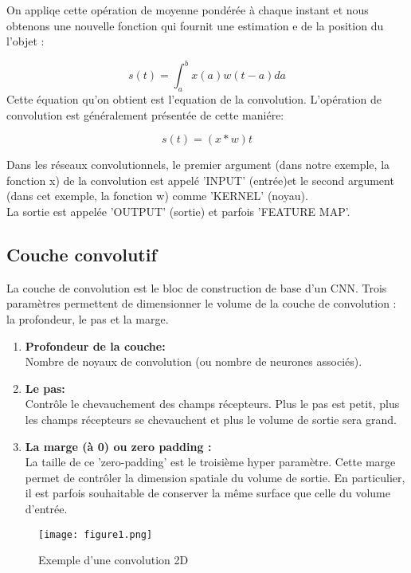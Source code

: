 \documentclass[a4paper,11pt]{report}
\begin{document}
On appliqe cette opération de moyenne pondérée à chaque instant et nous obtenons une
nouvelle fonction qui fournit une estimation e de la position du l'objet :

\begin{equation}
    s(t) =  \int_a^b  x(a)w(t-a)da
\end{equation}
Cette équation qu'on obtient est l'equation de la convolution. L’opération de convolution est généralement présentée  de cette maniére:       

\begin{equation}
    s(t) =   (x * w)t
\end{equation}

Dans les réseaux convolutionnels, le premier argument (dans notre exemple, la fonction x) de
la convolution est appelé 'INPUT' (entrée)et le second argument (dans cet exemple, la fonction
w) comme 'KERNEL' (noyau).\\
La sortie est appelée 'OUTPUT' (sortie) et parfois 'FEATURE MAP'.

\subsection {Couche convolutif}
La couche de convolution est le bloc de construction de base d'un CNN. Trois paramètres permettent de
dimensionner le volume de la couche de convolution : la profondeur, le pas et la marge.\\
\begin{enumerate}
    \item \textbf{Profondeur de la couche:} \\
    Nombre de noyaux de convolution (ou nombre de neurones associés).
    \item \textbf{Le pas:}\\
    Contrôle le chevauchement des champs récepteurs. Plus le pas est petit, plus les champs
récepteurs se chevauchent et plus le volume de sortie sera grand.
 \item \textbf{La marge (à 0) ou zero padding :} \\
 La taille de ce 'zero-padding' est le troisième hyper paramètre. Cette marge
permet de contrôler la dimension spatiale du volume de sortie. En particulier, il est parfois
souhaitable de conserver la même surface que celle du volume d'entrée.
    \end{enumerate}

\begin{figure}[!htbp]
\begin{center}
\texttt{[image: figure1.png]}
\caption{Exemple d’une convolution 2D}
\end{center}
\end{figure}
\end{document}
